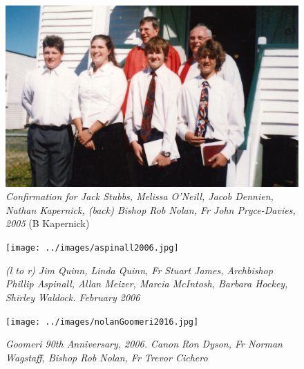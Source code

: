 \begin{figure}[!htb]
\begin{center}
\includegraphics[width=1.\textwidth,center]{../images/confirmation2005.jpg}
\caption{{\itshape Confirmation for Jack Stubbs, Melissa O'Neill, Jacob Dennien, Nathan Kapernick, (back) Bishop Rob Nolan, Fr John Pryce-Davies, 2005} {\scriptsize(B Kapernick)}}
\end{center}
\end{figure}










\begin{figure}[!htb]
\begin{center}
\texttt{[image: ../images/aspinall2006.jpg]}
\caption{\itshape (l to r) Jim Quinn, Linda Quinn, Fr Stuart James, Archbishop Phillip Aspinall, Allan Meizer, Marcia McIntosh, Barbara Hockey, Shirley Waldock. February 2006}
\end{center}
\end{figure}










\begin{figure}[!htb]
\begin{center}
\texttt{[image: ../images/nolanGoomeri2016.jpg]}
\caption{\itshape Goomeri 90th Anniversary, 2006. Canon Ron Dyson, Fr Norman Wagstaff, Bishop Rob Nolan, Fr Trevor Cichero}
\end{center}
\end{figure}










